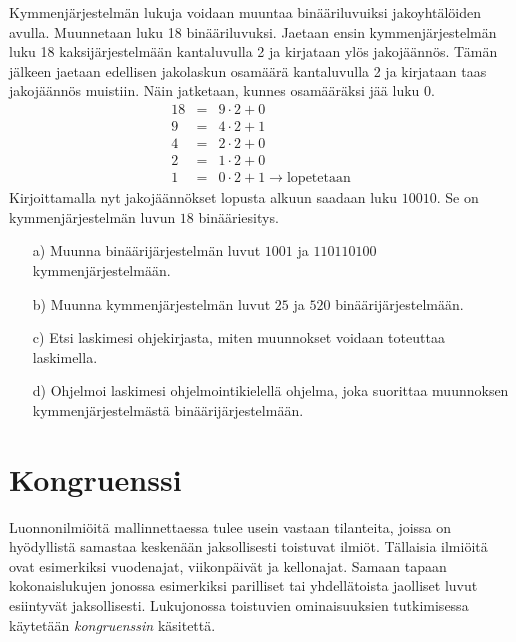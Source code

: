 \begin{enumerate}
Kymmenjärjestelmän lukuja voidaan muuntaa binääriluvuiksi jakoyhtälöiden avulla. Muunnetaan luku 18 binääriluvuksi. Jaetaan ensin kymmenjärjestelmän luku 18 kaksijärjestelmään kantaluvulla 2 ja kirjataan ylös jakojäännös. Tämän jälkeen jaetaan edellisen jakolaskun osamäärä kantaluvulla 2 ja kirjataan taas jakojäännös muistiin. Näin jatketaan, kunnes osamääräksi jää luku 0. 
\begin{eqnarray*}
18&=&9\cdot 2+0\\
9&=&4\cdot 2+1\\
4&=&2\cdot 2+0\\
2&=&1\cdot 2+0\\
1&=&0\cdot2+1 \to \textrm{lopetetaan}
\end{eqnarray*}
Kirjoittamalla nyt jakojäännökset lopusta alkuun saadaan luku $10010$. Se on kymmenjärjestelmän luvun $18$ binääriesitys.
\begin{itemize}
\item[a)] Muunna binäärijärjestelmän luvut $1001$ ja $110110100$ kymmenjärjestelmään.
\item[b)] Muunna kymmenjärjestelmän luvut $25$ ja $520$ binäärijärjestelmään.
\item[c)] Etsi laskimesi ohjekirjasta, miten muunnokset voidaan toteuttaa laskimella.
\item[d)] Ohjelmoi laskimesi ohjelmointikielellä ohjelma, joka suorittaa muunnoksen kymmenjärjestelmästä binäärijärjestelmään.
\end{itemize}

\end{enumerate}




\newpage


\section{Kongruenssi} 
Luonnonilmiöitä mallinnettaessa tulee usein vastaan tilanteita, joissa on hyödyllistä samastaa keskenään jaksollisesti toistuvat ilmiöt. Tällaisia ilmiöitä ovat esimerkiksi vuodenajat, viikonpäivät ja kellonajat. Samaan tapaan kokonaislukujen jonossa esimerkiksi parilliset tai yhdellätoista jaolliset luvut esiintyvät jaksollisesti. Lukujonossa toistuvien ominaisuuksien tutkimisessa käytetään {\em kongruenssin} käsitettä.

